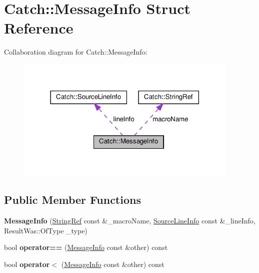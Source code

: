 \hypertarget{structCatch_1_1MessageInfo}{}\section{Catch\+::Message\+Info Struct Reference}
\label{structCatch_1_1MessageInfo}


Collaboration diagram for Catch\+::Message\+Info\+:\nopagebreak
\begin{figure}[H]
\begin{center}
\leavevmode
\includegraphics[width=302pt]{structCatch_1_1MessageInfo__coll__graph}
\end{center}
\end{figure}
\subsection*{Public Member Functions}
\begin{DoxyCompactItemize}
\item 
\mbox{\label{structCatch_1_1MessageInfo_afac7a84a9e8655428035a3c5418044f0}} 
{\bfseries Message\+Info} (\mbox{\hyperlink{classCatch_1_1StringRef}{String\+Ref}} const \&\+\_\+macro\+Name, \mbox{\hyperlink{structCatch_1_1SourceLineInfo}{Source\+Line\+Info}} const \&\+\_\+line\+Info, Result\+Was\+::\+Of\+Type \+\_\+type)
\item 
\mbox{\label{structCatch_1_1MessageInfo_af4b37f2172ba55395813b4bb6bbbde1a}} 
bool {\bfseries operator==} (\mbox{\hyperlink{structCatch_1_1MessageInfo}{Message\+Info}} const \&other) const
\item 
\mbox{\label{structCatch_1_1MessageInfo_a8254cb8fca2da02a29a9843cdcb79df1}} 
bool {\bfseries operator$<$} (\mbox{\hyperlink{structCatch_1_1MessageInfo}{Message\+Info}} const \&other) const
\end{DoxyCompactItemize}
